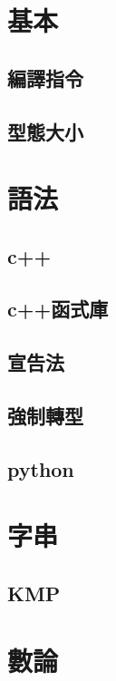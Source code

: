 \section{基本}
    \subsection{編譯指令}
        
    \subsection{型態大小}
        
        
\section{語法}
    \subsection{c++}
        
    \subsection{c++函式庫}
        
    \subsection{宣告法}
        
    \subsection{強制轉型}
        
    \subsection{python}
        
        
\section{字串}
    \subsection{KMP}
        
    
\section{數論}
